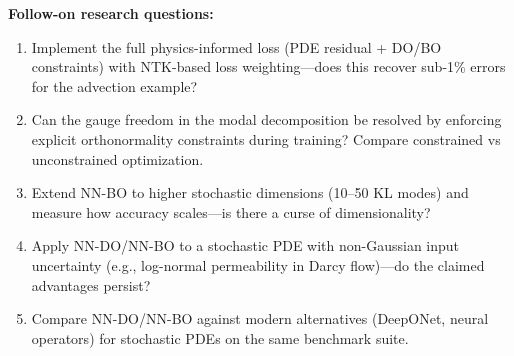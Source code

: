 \noindent\textbf{Follow-on research questions:}
\begin{enumerate}[leftmargin=1.6em,itemsep=0.2em,topsep=0.2em,label=Q\arabic*.]
\item Implement the full physics-informed loss (PDE residual + DO/BO constraints) with NTK-based loss weighting---does this recover sub-1\% errors for the advection example?
\item Can the gauge freedom in the modal decomposition be resolved by enforcing explicit orthonormality constraints during training? Compare constrained vs unconstrained optimization.
\item Extend NN-BO to higher stochastic dimensions (10--50 KL modes) and measure how accuracy scales---is there a curse of dimensionality?
\item Apply NN-DO/NN-BO to a stochastic PDE with non-Gaussian input uncertainty (e.g., log-normal permeability in Darcy flow)---do the claimed advantages persist?
\item Compare NN-DO/NN-BO against modern alternatives (DeepONet, neural operators) for stochastic PDEs on the same benchmark suite.
\end{enumerate}

